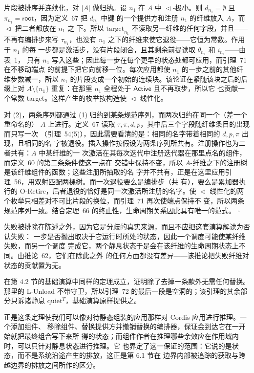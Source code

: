 \documentclass[
  10
]{article}
\begin{document}
片段被排序并连续化，对 \(|A|\) 做归纳。设 \(n_{1}\) 在 \(A\) 中 \(\vartriangleleft\)-极小。则
\(d_{n_{1}} = \emptyset\) 且 \(\pi_{n_{1}} = \mathsf{root}\)，因为定义~67 把 \(d_{n_{1}}\) 中键
的一个提供方和注册 \(n_{1}\) 的纤维放入 \(A\)，而 \(\vartriangleleft\) 把二者都放在 \(n_{1}\) 之
下。所以 \(\mathrm{target}_{n_{1}}\) 不读取另一纤维的任何字段，并且——不再有编排步来写
\(\tau_{n_{1}}\)，也没有 \(n_{1}\) 之下的纤维来使它退役——它恒为常数。作用于 \(n_{1}\) 的每
一步都是激活步，没有片段闭合，且其剩余前提读取 \(\theta_{n_{1}}\) 和 \(i_{n_{1}}\)——由表~1，
只有 \(n_{1}\) 写入这些；因此每一步在每个更早的状态处都可应用，而引理~71 在不移动端点
的前提下把它向前移一位。每次应用都使 \(n_{1}\) 的一步之前的其他纤维步数减一，所以
\(n_{1}\) 的片段变成一个初始的连续块。该论证在紧随该块之后的后缀上对
\(A \setminus \{n_{1}\}\) 重复：在那里 \(n_{1}\) 全程处于 \(\mathsf{Active}\) 且不再取步，所以它
也贡献一个常数 target。这样产生的枚举按构造使 \(\vartriangleleft\) 线性化。

对 (2)，两条序列都通过 (1) 归约到某条规范序列，而两次归约在同一个（差一个重命名的）
\(A\) 上进行。定义~67 读取 \(\tau, \pi, d, p\)，其中后三个字段随纤维条目的出现而只写一次
（引理~54(5)），因此需要看清的是：相同的名字带着相同的 \(d, p, \pi\) 出现，且相同的名
字被退役。插入操作按假设为两条序列所共有。注册操作也为二者共有：\(A\) 中某纤维的一
次激活在其每次迭代中注册迭代器在那里点名的组件，而定义~60 的第二条条件使这一点在
交错中保持不变，所以 \(A\)-纤维之下的注册树是该纤维组件的函数；这些注册所抽取的名
字并不共有，正是在这里应用引理~56，用双射匹配两棵树。而一次退役要么是编排步（共
有），要么是累加器执行的 O-Retire，后者退役的恰好是同一次激活所注册的名字。使
\(\vartriangleleft\) 线性化的两个枚举只相差对不可比片段的换位，而引理~71 再次使端点保持不
变，所以两条规范序列一致。结合定理~66 的终止性，生命周期关系因此具有唯一的范式。
\(\square\)

失败被排除在陈述之外，因为它是分歧的真实来源，而且不应把这套演算解读为否认失败：
一步是否抛出取决于它运行时所处的状态，因此一个调度可能使某纤维失败，而另一个调度
完成它，两个静息状态于是会在该纤维的生命周期状态上不同。由推论~62，它们在除此之外
的任何方面都没有差异——该推论把失败纤维对状态的贡献置为无。

在第 4.2 节的基础演算中同样的定理成立，证明除了去掉一条款外无需任何替换。那里的
L-Unload 不带守卫，所以引理~72 的最后一段是空洞的；该引理的其余部分只诉诸静息
\(\mathrm{quiet}^{T}\)，基础演算原样提供之。

正是这条定理使我们可以像对待静态组装的应用那样对 Cordis 应用进行推理。一个添加组件、
移除组件、替换提供方并撤销替换的编排器，保证会到达它在一开始就把最终组合写下来所
得的状态；而组件作者在推理哪些余效应在作用域内时，可以只针对静息状态进行推理。它
也界定了这一保证的范围：它说的是状态，而不是系统沿途产生的排放，这正是第 6.1 节在
边界内部被追踪的获取与跨越边界的排放之间所作的区分。
\end{document}
